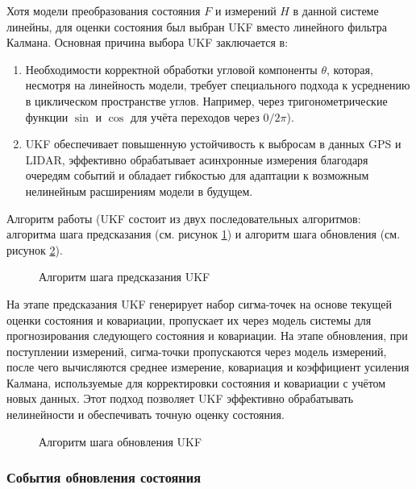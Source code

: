 Хотя модели преобразования состояния \({F}\) и измерений \({H}\) в данной системе линейны,
для оценки состояния был выбран UKF вместо линейного фильтра Калмана. Основная причина выбора UKF заключается в:
\begin{enumerate}[label=\arabic*]
	\item Необходимости корректной обработки угловой компоненты \(\theta\), 
		которая, несмотря на линейность модели, требует специального подхода к усреднению в циклическом пространстве углов.
		Например, через тригонометрические функции \(\sin\) и \(\cos\) для учёта переходов через \(0/2\pi\)).
	\item UKF обеспечивает повышенную устойчивость к выбросам в данных GPS и LIDAR, 
		эффективно обрабатывает асинхронные измерения благодаря очередям событий и обладает гибкостью для адаптации к
		возможным нелинейным расширениям модели в будущем.
\end{enumerate}

Алгоритм работы (UKF состоит из двух последовательных алгоритмов:
алгоритма шага предсказания (см. рисунок \ref{fig:ukf_predict}) 
и алгоритм шага обновления (см. рисунок \ref{fig:ukf_update}).

\FloatBarrier
\begin{figure}[H]
\centering
\caption{Алгоритм шага предсказания UKF}
\label{fig:ukf_predict}
\end{figure}

На этапе предсказания UKF генерирует набор сигма-точек на основе текущей оценки состояния и ковариации, 
пропускает их через модель системы для прогнозирования следующего состояния и ковариации.
На этапе обновления, при поступлении измерений, сигма-точки пропускаются через модель измерений, после чего вычисляются среднее измерение, 
ковариация и коэффициент усиления Калмана, используемые для корректировки состояния и ковариации с учётом новых данных.
Этот подход позволяет UKF эффективно обрабатывать нелинейности и обеспечивать точную оценку состояния.

\FloatBarrier
\begin{figure}[H]
\centering
\caption{Алгоритм шага обновления UKF}
\label{fig:ukf_update}
\end{figure}

\subsubsection{События обновления состояния}

